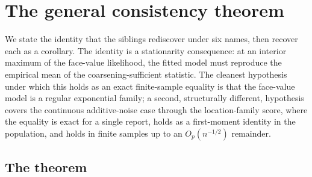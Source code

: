 \section{The general consistency theorem}
\label{sec:consistency}

We state the identity that the siblings rediscover under six names,
then recover each as a corollary. The identity is a stationarity
consequence: at an interior maximum of the face-value likelihood, the
fitted model must reproduce the empirical mean of the
coarsening-sufficient statistic. The cleanest hypothesis under which
this holds as an exact finite-sample equality is that the face-value
model is a regular exponential family; a second, structurally
different, hypothesis covers the continuous additive-noise case through
the location-family score, where the equality is exact for a single
report, holds as a first-moment identity in the population, and holds
in finite samples up to an $O_p(n^{-1/2})$ remainder.

\subsection{The theorem}

